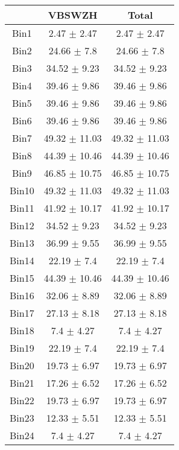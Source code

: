   \begin{tabular}{|c|c|c|}
  \hline
      & VBSWZH & Total \\ \cline{1-3} 
     \hline\hline
     Bin1 & 2.47 $\pm$ 2.47 & 2.47 $\pm$ 2.47 \\ \cline{1-3} 
     Bin2 & 24.66 $\pm$ 7.8 & 24.66 $\pm$ 7.8 \\ \cline{1-3} 
     Bin3 & 34.52 $\pm$ 9.23 & 34.52 $\pm$ 9.23 \\ \cline{1-3} 
     Bin4 & 39.46 $\pm$ 9.86 & 39.46 $\pm$ 9.86 \\ \cline{1-3} 
     Bin5 & 39.46 $\pm$ 9.86 & 39.46 $\pm$ 9.86 \\ \cline{1-3} 
     Bin6 & 39.46 $\pm$ 9.86 & 39.46 $\pm$ 9.86 \\ \cline{1-3} 
     Bin7 & 49.32 $\pm$ 11.03 & 49.32 $\pm$ 11.03 \\ \cline{1-3} 
     Bin8 & 44.39 $\pm$ 10.46 & 44.39 $\pm$ 10.46 \\ \cline{1-3} 
     Bin9 & 46.85 $\pm$ 10.75 & 46.85 $\pm$ 10.75 \\ \cline{1-3} 
     Bin10 & 49.32 $\pm$ 11.03 & 49.32 $\pm$ 11.03 \\ \cline{1-3} 
     Bin11 & 41.92 $\pm$ 10.17 & 41.92 $\pm$ 10.17 \\ \cline{1-3} 
     Bin12 & 34.52 $\pm$ 9.23 & 34.52 $\pm$ 9.23 \\ \cline{1-3} 
     Bin13 & 36.99 $\pm$ 9.55 & 36.99 $\pm$ 9.55 \\ \cline{1-3} 
     Bin14 & 22.19 $\pm$ 7.4 & 22.19 $\pm$ 7.4 \\ \cline{1-3} 
     Bin15 & 44.39 $\pm$ 10.46 & 44.39 $\pm$ 10.46 \\ \cline{1-3} 
     Bin16 & 32.06 $\pm$ 8.89 & 32.06 $\pm$ 8.89 \\ \cline{1-3} 
     Bin17 & 27.13 $\pm$ 8.18 & 27.13 $\pm$ 8.18 \\ \cline{1-3} 
     Bin18 & 7.4 $\pm$ 4.27 & 7.4 $\pm$ 4.27 \\ \cline{1-3} 
     Bin19 & 22.19 $\pm$ 7.4 & 22.19 $\pm$ 7.4 \\ \cline{1-3} 
     Bin20 & 19.73 $\pm$ 6.97 & 19.73 $\pm$ 6.97 \\ \cline{1-3} 
     Bin21 & 17.26 $\pm$ 6.52 & 17.26 $\pm$ 6.52 \\ \cline{1-3} 
     Bin22 & 19.73 $\pm$ 6.97 & 19.73 $\pm$ 6.97 \\ \cline{1-3} 
     Bin23 & 12.33 $\pm$ 5.51 & 12.33 $\pm$ 5.51 \\ \cline{1-3} 
     Bin24 & 7.4 $\pm$ 4.27 & 7.4 $\pm$ 4.27 \\ \cline{1-3} 

\end{tabular}
